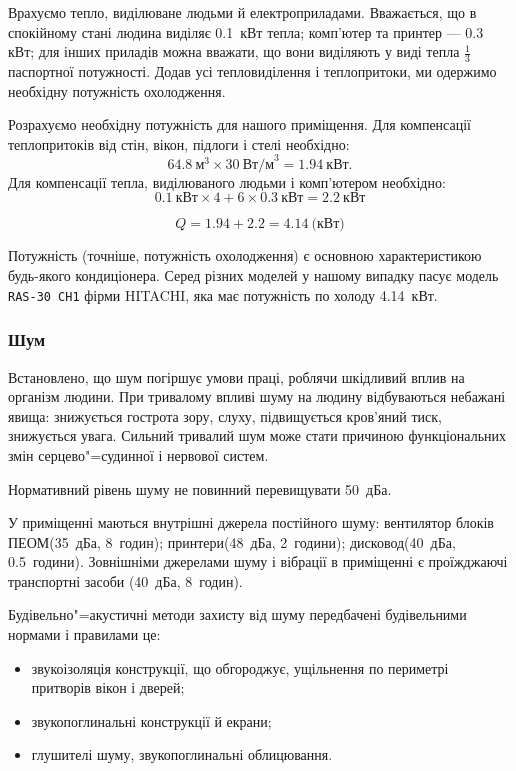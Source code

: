\documentclass[simple,14pt,utf8,ukrainian]{eskdtext}
\begin{document}
      Врахуємо тепло, виділюване людьми й електроприладами.
      Вважається, що в спокійному стані людина виділяє \num{0.1}~кВт тепла;
      комп’ютер та принтер --- \num{0.3} кВт; для інших приладів можна
      вважати, що вони виділяють у виді тепла $\frac{1}{3}$ паспортної
      потужності.
      Додав усі тепловиділення і теплопритоки, ми одержимо необхідну
      потужність охолодження.

      Розрахуємо необхідну потужність для нашого приміщення.
      Для компенсації теплопритоків від стін, вікон, підлоги і стелі
      необхідно:\[
      64.8~\text{м}^3 \times 30~\text{Вт/м}^3 = 1.94~\text{кВт}. \]
      Для компенсації тепла, виділюваного людьми і комп’ютером необхідно:
      \[
        0.1~\text{кВт} \times 4 + 6 \times 0.3~\text{кВт}= 2.2~\text{кВт}
      \]

      \begin{equation}
        Q = 1.94 + 2.2 = 4.14~\text{(кВт)}
        \label{eq:q}
      \end{equation}

      Потужність (точніше, потужність охолодження) є основною характеристикою
      будь-якого кондиціонера.
      Серед різних моделей у нашому випадку пасує модель \texttt{RAS-30 CH1}
      фірми HITACHI, яка має потужність по холоду \num{4.14}~кВт.
    \subsubsection{Шум}
      Встановлено, що шум погіршує умови праці, роблячи шкідливий вплив на
      організм людини.
      При тривалому впливі шуму на людину відбуваються небажані явища:
      знижується гострота зору, слуху, підвищується кров’яний тиск, знижується
      увага.
      Сильний тривалий шум може стати причиною функціональних змін
      серцево"=судинної і нервової систем.

      Нормативний рівень шуму не повинний перевищувати \num{50}~дБа\cite{dsn}.

      У приміщенні маються внутрішні джерела постійного шуму: вентилятор
      блоків ПЕОМ(\num{35}~дБа, \num{8}~годин); принтери(\num{48}~дБа,
      \num{2}~години); дисковод(\num{40}~дБа, \num{0.5}~години).
      Зовнішніми джерелами шуму і вібрації в приміщенні є проїжджаючі
      транспортні засоби (\num{40}~дБа, \num{8}~годин).

      Будівельно"=акустичні методи захисту від шуму передбачені будівельними
      нормами і правилами це:
      \begin{itemize}
        \item звукоізоляція конструкції, що обгороджує, ущільнення по
          периметрі притворів вікон і дверей;
        \item звукопоглинальні конструкції й екрани;
        \item глушителі шуму, звукопоглинальні облицювання.
      \end{itemize}
\end{document}
